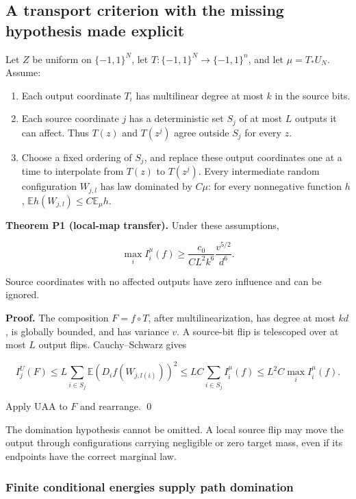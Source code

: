 \subsection{A transport criterion with the missing hypothesis made
explicit}\label{proof:positive_structure:a-transport-criterion-with-the-missing-hypothesis-made-explicit}

Let \(Z\) be uniform on \(\{-1,1\}^N\), let \(T:\{-1,1\}^N \to\{-1,1\}^n\),
and let \(\mu =T_*U_N\). Assume:

\begin{enumerate}
\def\labelenumi{\arabic{enumi}.}
\tightlist
\item
  Each output coordinate \(T_i\) has multilinear degree at most \(k\) in
  the source bits.
\item
  Each source coordinate \(j\) has a deterministic set \(S_j\) of at
  most \(L\) outputs it can affect. Thus \(T(z)\) and \(T(z^j)\) agree
  outside \(S_j\) for every \(z\).
\item
  Choose a fixed ordering of \(S_j\), and replace these output
  coordinates one at a time to interpolate from \(T(z)\) to \(T(z^j)\).
  Every intermediate random configuration \(W_{j,l}\) has law dominated
  by \(C \mu\): for every nonnegative function \(h\),
  \(\mathbb{E} h(W_{j,l}) \le  C \mathbb{E}_\mu  h\).
\end{enumerate}

\textbf{Theorem P1 (local-map transfer).} Under these assumptions,

\[
\boxed{\max_i I_i^\mu(f)
\ge \frac{c_0}{C L^2 k^6}\frac{v^{5/2}}{d^6}.}
\tag{P1}
\]

Source coordinates with no affected outputs have zero influence and can
be ignored.

\textbf{Proof.} The composition \(F=f\circ T\), after
multilinearization, has degree at most \(kd\), is globally bounded, and
has variance \(v\). A source-bit flip is telescoped over at most \(L\)
output flips. Cauchy--Schwarz gives

\[
I_j^U(F)\le L\sum_{i\in S_j}\mathbb E(D_i f(W_{j,l(i)}))^2
\le LC\sum_{i\in S_j}I_i^\mu(f)
\le L^2C\max_i I_i^\mu(f).
\]

Apply UAA to \(F\) and rearrange. \qed

The domination hypothesis cannot be omitted. A local source flip may
move the output through configurations carrying negligible or zero
target mass, even if its endpoints have the correct marginal law.

\subsubsection{Finite conditional energies supply path
domination}\label{proof:positive_structure:finite-conditional-energies-supply-path-domination}

